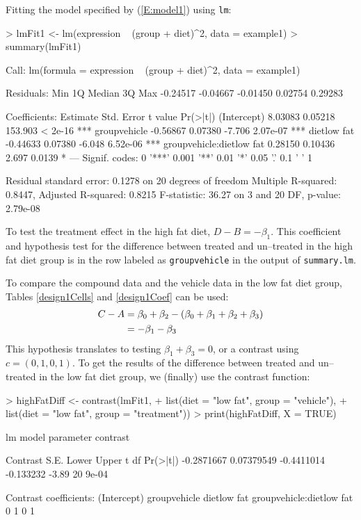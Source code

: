 \documentclass[12pt]{article}
\newcommand{\code}[1]{\mbox{\footnotesize\color{darkblue}\texttt{#1}}}
\renewenvironment{Schunk}{\vspace{\topsep}}{\vspace{\topsep}}
\begin{document}
Fitting the model specified by  (\ref{E:model1}) using \code{lm}:
\begin{Schunk}
\begin{Sinput}
> lmFit1 <- lm(expression ~ (group + diet)^2, data = example1)
> summary(lmFit1)
\end{Sinput}
\begin{Soutput}
Call:
lm(formula = expression ~ (group + diet)^2, data = example1)

Residuals:
     Min       1Q   Median       3Q      Max 
-0.24517 -0.04667 -0.01450  0.02754  0.29283 

Coefficients:
                         Estimate Std. Error t value Pr(>|t|)    
(Intercept)               8.03083    0.05218 153.903  < 2e-16 ***
groupvehicle             -0.56867    0.07380  -7.706 2.07e-07 ***
dietlow fat              -0.44633    0.07380  -6.048 6.52e-06 ***
groupvehicle:dietlow fat  0.28150    0.10436   2.697   0.0139 *  
---
Signif. codes:  0 '***' 0.001 '**' 0.01 '*' 0.05 '.' 0.1 ' ' 1

Residual standard error: 0.1278 on 20 degrees of freedom
Multiple R-squared:  0.8447,	Adjusted R-squared:  0.8215 
F-statistic: 36.27 on 3 and 20 DF,  p-value: 2.79e-08
\end{Soutput}
\end{Schunk}


To test the treatment effect in the high fat diet, $D-B = -\beta_1$. This coefficient and hypothesis test for the difference between treated and un--treated in the high fat diet group is in the row labeled as \code{groupvehicle} in the output of \code{summary.lm}. 


To compare the compound data and the vehicle data in the low fat diet group, Tables \ref{design1Cells} and \ref{design1Coef} can be used:
\begin{align}
C - A &= 	\beta_0 + \beta_2 -(\beta_0+\beta_1+\beta_2+\beta_{3}) \notag \\
	&= -\beta_1 - \beta_{3} \notag
\end{align}
This hypothesis translates to testing $\beta_1 + \beta_{3} = 0$, or a contrast using $c=(0, 1, 0, 1)$. To get the results of the difference between treated and un--treated in the low fat diet group, we (finally) use the contrast function:
\begin{Schunk}
\begin{Sinput}
> highFatDiff <- contrast(lmFit1, 
+                         list(diet = "low fat", group = "vehicle"),
+                         list(diet = "low fat", group = "treatment"))
> print(highFatDiff, X = TRUE)
\end{Sinput}
\begin{Soutput}
lm model parameter contrast

   Contrast       S.E.      Lower     Upper     t df Pr(>|t|)
 -0.2871667 0.07379549 -0.4411014 -0.133232 -3.89 20    9e-04

Contrast coefficients:
 (Intercept) groupvehicle dietlow fat groupvehicle:dietlow fat
           0            1           0                        1
\end{Soutput}
\end{Schunk}
\end{document}
